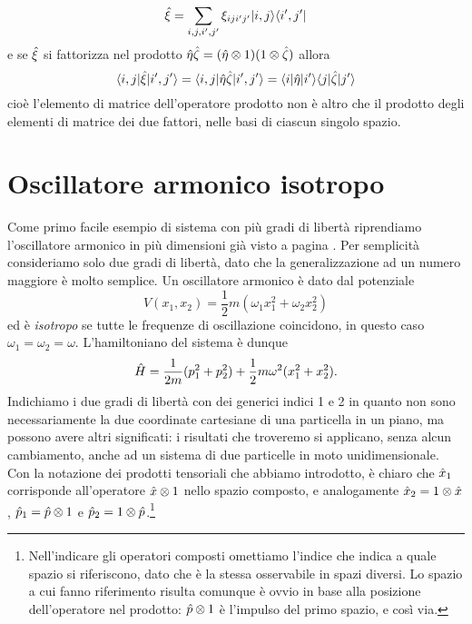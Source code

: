 \begin{equation}
	\hat{\xi}=\sum_{i,j,i',j'}\xi_{iji'j'}\lvert i,j\rangle\langle i',j'\rvert
\end{equation}
e se $\hat{\xi}$ si fattorizza nel prodotto $\hat{\eta}\hat{\zeta}=(\hat{\eta}\otimes 1)(1\otimes\hat{\zeta})$ allora
\begin{equation}
	\langle i,j\rvert\hat{\xi}\lvert i',j'\rangle=\langle i,j\rvert\hat{\eta}\hat{\zeta}\lvert i',j'\rangle=\langle i\rvert\hat{\eta}\lvert i'\rangle\langle j\rvert\hat{\zeta}\lvert j'\rangle
\end{equation}
cioè l'elemento di matrice dell'operatore prodotto non è altro che il prodotto degli elementi di matrice dei due fattori, nelle basi di ciascun singolo spazio.

\section{Oscillatore armonico isotropo}
Come primo facile esempio di sistema con più gradi di libertà riprendiamo l'oscillatore armonico in più dimensioni già visto a pagina \pageref{sec:oscillatore-armonico-multidimensionale}.
Per semplicità consideriamo solo due gradi di libertà, dato che la generalizzazione ad un numero maggiore è molto semplice.
Un oscillatore armonico è dato dal potenziale
\begin{equation}
	V(x_1,x_2)=\frac12m(\omega_1x_1^2+\omega_2x_2^2)
\end{equation}
ed è \emph{isotropo} se tutte le frequenze di oscillazione coincidono, in questo caso $\omega_1=\omega_2=\omega$.
L'hamiltoniano del sistema è dunque
\begin{equation}
	\hat{H}=\frac1{2m}(p_1^2+p_2^2)+\frac12m\omega^2(x_1^2+x_2^2).
\end{equation}
Indichiamo i due gradi di libertà con dei generici indici 1 e 2 in quanto non sono necessariamente la due coordinate cartesiane di una particella in un piano, ma possono avere altri significati: i risultati che troveremo si applicano, senza alcun cambiamento, anche ad un sistema di due particelle in moto unidimensionale.
Con la notazione dei prodotti tensoriali che abbiamo introdotto, è chiaro che $\hat{x}_1$ corrisponde all'operatore $\hat{x}\otimes 1$ nello spazio composto, e analogamente $\hat{x}_2=1\otimes\hat{x}$, $\hat{p}_1=\hat{p}\otimes 1$ e $\hat{p}_2=1\otimes\hat{p}$.\footnote{
	Nell'indicare gli operatori composti omettiamo l'indice che indica a quale spazio si riferiscono, dato che è la stessa osservabile in spazi diversi.
	Lo spazio a cui fanno riferimento risulta comunque è ovvio in base alla posizione dell'operatore nel prodotto: $\hat{p}\otimes 1$ è l'impulso del primo spazio, e cos\`i via.
}

